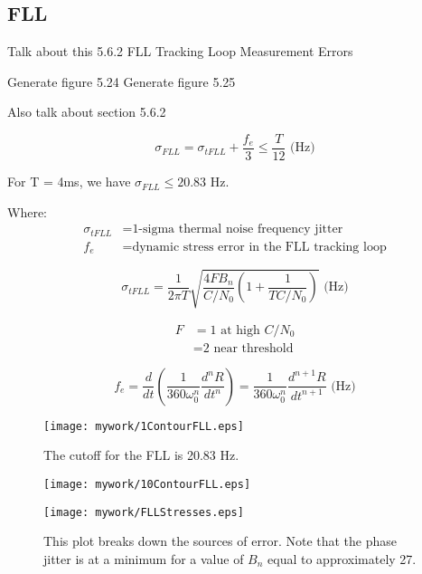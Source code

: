 \subsection{FLL}


Talk about this
5.6.2 FLL Tracking Loop Measurement Errors

Generate figure 5.24
Generate figure 5.25

Also talk about section 5.6.2

\begin{equation}
\sigma_{FLL} =  \sigma_{tFLL} + \frac{f_e}{3} \leq \frac{T}{12} \text{ (Hz)}
\end{equation}

For T = 4ms, we have $\sigma_{FLL} \leq 20.83$ Hz.

Where:
\begin{align*}
\sigma_{tFLL} &= \text{1-sigma thermal noise frequency jitter}\\
f_e &= \text{dynamic stress error in the FLL tracking loop}
\end{align*}


\begin{equation}
\sigma_{tFLL} = \frac{1}{2 \pi T} \sqrt{ \frac{4FB_n}{C/N_0}(1 + \frac{1}{TC/N_0})} \text{ (Hz)}
\end{equation}

\begin{align*}
F &= \text{1 at high } C/N_0\\
  &= \text{2 near threshold}
\end{align*}


\begin{equation}
f_e = \frac{d}{dt}(\frac{1}{360 \omega^n_0}\frac{d^nR}{dt^n}) = \frac{1}{360\omega^n_0} \frac{d^{n+1}R}{dt^{n+1}} \text{ (Hz)}
\end{equation}


\begin{figure}[!htb] 
    \centering
    \texttt{[image: mywork/1ContourFLL.eps]} 
    \caption{The cutoff for the FLL is 20.83 Hz.}
\end{figure}

\begin{figure}[!htb] 
    \centering
    \texttt{[image: mywork/10ContourFLL.eps]} 
    \caption{}
\end{figure}



\begin{figure}[!htb] 
    \centering
    \texttt{[image: mywork/FLLStresses.eps]} 
    \caption{This plot breaks down the sources of error. Note that the phase jitter is at a minimum for a value of $B_n$ equal to approximately 27.}
\end{figure}




